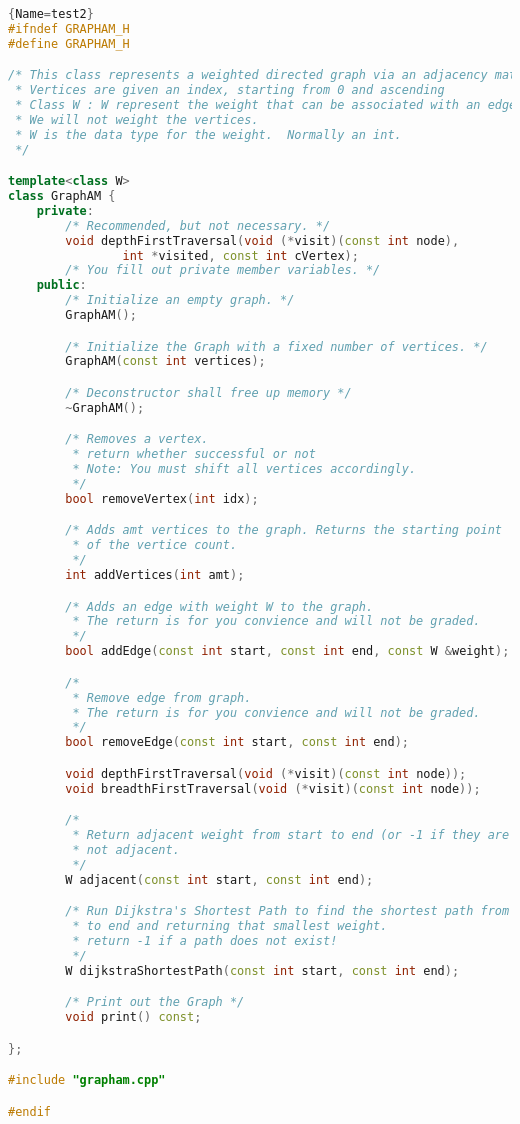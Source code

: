 \documentclass[12pt]{article}
\begin{document}
\begin{lstlisting}[language=C++]{Name=test2}
#ifndef GRAPHAM_H
#define GRAPHAM_H

/* This class represents a weighted directed graph via an adjacency matrix.
 * Vertices are given an index, starting from 0 and ascending
 * Class W : W represent the weight that can be associated with an edge.
 * We will not weight the vertices.
 * W is the data type for the weight.  Normally an int.
 */

template<class W>
class GraphAM {
    private:
        /* Recommended, but not necessary. */
        void depthFirstTraversal(void (*visit)(const int node),
                int *visited, const int cVertex);
        /* You fill out private member variables. */
    public:
        /* Initialize an empty graph. */
        GraphAM();

        /* Initialize the Graph with a fixed number of vertices. */
        GraphAM(const int vertices);

        /* Deconstructor shall free up memory */
        ~GraphAM();

        /* Removes a vertex. 
         * return whether successful or not
         * Note: You must shift all vertices accordingly.
         */
        bool removeVertex(int idx);

        /* Adds amt vertices to the graph. Returns the starting point 
         * of the vertice count.
         */
        int addVertices(int amt);

        /* Adds an edge with weight W to the graph.
         * The return is for you convience and will not be graded.
         */
        bool addEdge(const int start, const int end, const W &weight);

        /* 
         * Remove edge from graph.
         * The return is for you convience and will not be graded.
         */
        bool removeEdge(const int start, const int end);

        void depthFirstTraversal(void (*visit)(const int node));
        void breadthFirstTraversal(void (*visit)(const int node));

        /*
         * Return adjacent weight from start to end (or -1 if they are
         * not adjacent.
         */
        W adjacent(const int start, const int end);

        /* Run Dijkstra's Shortest Path to find the shortest path from start
         * to end and returning that smallest weight.
         * return -1 if a path does not exist!
         */
        W dijkstraShortestPath(const int start, const int end);

        /* Print out the Graph */
        void print() const;

};

#include "grapham.cpp"

#endif
\end{lstlisting}
\end{document}

